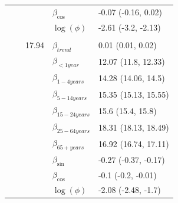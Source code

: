 \documentclass[a4paper,twoside,11pt]{report} %
\theoremstyle{definition}
\theoremstyle{definition}
\theoremstyle{definition}
\theoremstyle{definition}
\theoremstyle{remark}
\begin{document}
\begin{longtable}[t]{llrll}
 &  &  & $\beta_{\cos}$ & -0.07 (-0.16, 0.02)\\

\hspace{1em}\hspace{1em} &  &  & $\log(\phi)$ & -2.61 (-3.2, -2.13)\\
\cmidrule{2-5}
\addlinespace[0.3em]
\multicolumn{5}{l}{\begin{math}\log(\lambda_{it})=\beta(ageGroup_{i})+\beta_{trend} t + \beta_{\sin} \sin\Big(\frac{\pi\cdot \tau_{t}}{6}\Big) + \beta_{\cos} \cos\Big(\frac{\pi \cdot \tau_{t}}{6}\Big)+\log(n_{it})\end{math}}\\
\hspace{1em}\hspace{1em} &  & 17.94 & $\beta_{trend}$ & 0.01 (0.01, 0.02)\\

\hspace{1em}\hspace{1em} &  &  & $\beta_{<1 year}$ & 12.07 (11.8, 12.33)\\

\hspace{1em}\hspace{1em} &  &  & $\beta_{1-4 years}$ & 14.28 (14.06, 14.5)\\

\hspace{1em}\hspace{1em} &  &  & $\beta_{5-14 years}$ & 15.35 (15.13, 15.55)\\

\hspace{1em}\hspace{1em} &  &  & $\beta_{15-24 years}$ & 15.6 (15.4, 15.8)\\

\hspace{1em}\hspace{1em} &  &  & $\beta_{25-64 years}$ & 18.31 (18.13, 18.49)\\

\hspace{1em}\hspace{1em} &  &  & $\beta_{65+ years}$ & 16.92 (16.74, 17.11)\\

\hspace{1em}\hspace{1em} &  &  & $\beta_{\sin}$ & -0.27 (-0.37, -0.17)\\

\hspace{1em}\hspace{1em} &  &  & $\beta_{\cos}$ & -0.1 (-0.2, -0.01)\\

\hspace{1em}\hspace{1em} &  &  & $\log(\phi)$ & -2.08 (-2.48, -1.7)\\*
\end{longtable}

%
\cleartoleftpage

\end{document}
